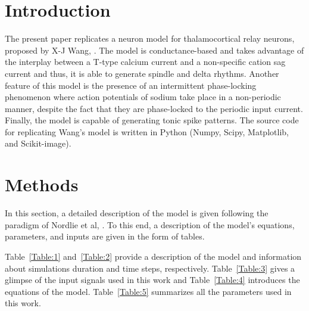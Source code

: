 \documentclass[10pt,a4paper,onecolumn]{article}
\begin{document}
\section{Introduction}\label{introduction}

The present paper replicates a neuron model for thalamocortical relay neurons,
proposed by X-J Wang, \cite{wang:1994}. The model is conductance-based and 
takes advantage of the interplay between a T-type calcium current and a 
non-specific cation sag current and thus, it is able to generate spindle
and delta rhythms. Another feature of this model is the presence of an
intermittent phase-locking phenomenon where action potentials of sodium take
place in a non-periodic manner, despite the fact that they are phase-locked to
the periodic input current. Finally, the model is capable of generating tonic
spike patterns. The source code for replicating Wang's model is written in
Python (Numpy, Scipy, Matplotlib, and Scikit-image).


\section{Methods}\label{methods}

In this section, a detailed description of the model is given following 
the paradigm of Nordlie et al, \cite{nordlie:2009}. To this end, a description
of the model's equations, parameters, and inputs are given in the form of
tables. 

Table~\ref{Table:1} and~\ref{Table:2} provide a description of the model and 
information about simulations duration and time steps, respectively. 
Table~\ref{Table:3} gives a glimpse of the input signals used in this work and
Table~\ref{Table:4} introduces the equations of the model. Table~\ref{Table:5}
summarizes all the parameters used in this work.
\end{document}
